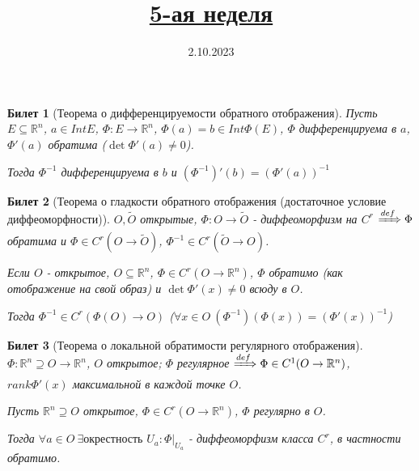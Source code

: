 \documentclass[11pt,a4paper,oneside]{scrartcl}
\title{\href{https://youtu.be/KuG517F82VE?si=f8m6ZjJHx0_MvQsf}{5-ая неделя}}
\date{2.10.2023}
\newtheorem{ticket}{Билет}
\begin{document}
\pagestyle{empty}

\maketitle

\setcounter{ticket}{15}
\addtocounter{ticket}{-1}
\begin{ticket}[Теорема о дифференцируемости обратного отображения]
    Пусть $E \subseteq \mathbb{R}^n$, $a \in IntE$, $\Phi: E \rightarrow \mathbb{R}^n$,
    $\Phi(a) = b \in Int \Phi(E)$, $\Phi$ дифференцируема в $a$,
    $\Phi'(a)$ обратима ($\det \Phi'(a) \neq 0$).

    Тогда $\Phi^{-1}$ дифференцируема в $b$ и $(\Phi^{-1})'(b) = (\Phi'(a))^{-1}$
\end{ticket}

\begin{ticket}[Теорема о гладкости обратного отображения (достаточное условие диффеоморфности)]
    $O, \tilde{O}$ открытые, $\Phi: O \rightarrow \tilde{O}$ - диффеоморфизм на $C^r$ $\xRightarrow{def} \Phi$ обратима
    и $\Phi \in C^r(O \rightarrow \tilde{O})$, $\Phi^{-1} \in C^r(\tilde{O} \rightarrow O)$.

    Если $O$ - открытое, $O \subseteq \mathbb{R}^n$, $\Phi \in C^r(O \rightarrow \mathbb{R}^n)$,
    $\Phi$ обратимо (как отображение на свой образ) и $\det \Phi'(x) \neq 0$ всюду в $O$.

    Тогда $\Phi^{-1} \in C^r(\Phi(O) \rightarrow O)$
    ($\forall x \in O \ (\Phi^{-1})(\Phi(x)) = (\Phi'(x))^{-1}$)
\end{ticket}

\begin{ticket}[Теорема о локальной обратимости регулярного отображения]
    $\Phi: \mathbb{R}^n \supseteq O \rightarrow \mathbb{R}^n$, $O$ открытое;
    $\Phi$ регулярное $\xRightarrow{def} \Phi \in C^1(O \rightarrow \mathbb{R}^n)$,
    $rank \Phi'(x)$ максимальной в каждой точке $O$.

    Пусть $\mathbb{R}^n \supseteq O$ открытое, $\Phi \in C^r(O \rightarrow \mathbb{R}^n)$,
    $\Phi$ регулярно в $O$.

    Тогда $\forall a \in O \ \exists \text{окрестность } U_a: \Phi |_{U_a}$
    - диффеоморфизм класса $C^r$, в частности обратимо.
\end{ticket}
\end{document}
